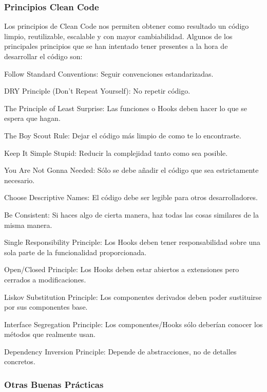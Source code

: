 \documentclass[12pt,twoside,titlepage]{report}
\begin{document}
\subsubsection{Principios Clean Code}
\label{sec:cleancode}

Los principios de Clean Code \cite{cleancode} nos permiten obtener como resultado un código limpio, reutilizable, escalable y con mayor cambiabilidad. Algunos de los principales principios que se han intentado tener presentes a la hora de desarrollar el código son:

\begin{compactitem}
    \item Follow Standard Conventions: Seguir convenciones estandarizadas.
    \item DRY Principle (Don't Repeat Yourself): No repetir código.
    \item The Principle of Least Surprise: Las funciones o Hooks deben hacer lo que se espera que hagan.
    \item The Boy Scout Rule: Dejar el código más limpio de como te lo encontraste.
    \item Keep It Simple Stupid: Reducir la complejidad tanto como sea posible.
    \item You Are Not Gonna Needed: Sólo se debe añadir el código que sea estrictamente necesario.
    \item Choose Descriptive Names: El código debe ser legible para otros desarrolladores.
    \item Be Consistent: Si haces algo de cierta manera, haz todas las cosas similares de la misma manera.
    \item Single Responsibility Principle: Los Hooks deben tener responsabilidad sobre una sola parte de la funcionalidad proporcionada.
    \item Open/Closed Principle: Los Hooks deben estar abiertos a extensiones pero cerrados a modificaciones.
    \item Liskov Substitution Principle: Los componentes derivados deben poder sustituirse por sus componentes base.
    \item Interface Segregation Principle: Los componentes/Hooks sólo deberían conocer los métodos que realmente usan.
    \item Dependency Inversion Principle: Depende de abstracciones, no de detalles concretos.
\end{compactitem}

\subsubsection{Otras Buenas Prácticas}
\label{sec:otrasPracticas}
\end{document}
